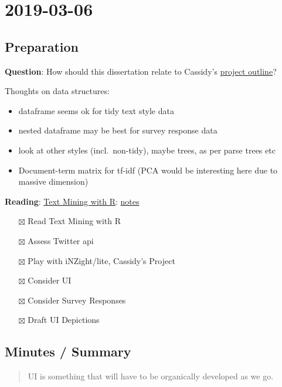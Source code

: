 \documentclass[11pt]{article}
\date{\today}
\title{}
\begin{document}
\tableofcontents

\section{2019-03-06}
\label{sec:orgde47e23}
\subsection{Preparation}
\label{sec:org7bba46c}
\textbf{Question}: How should this dissertation relate to Cassidy's
\href{../reading/CassidyStuff/CassidyStuff/Our\%20text\%20analytics\%20project.docx}{project
outline}?

Thoughts on data structures:

\begin{itemize}
\item dataframe seems ok for tidy text style data
\item nested dataframe may be best for survey response data
\item look at other styles (incl. non-tidy), maybe trees, as per parse trees
etc
\item Document-term matrix for tf-idf (PCA would be interesting here due to
massive dimension)
\end{itemize}

\textbf{Reading}: \href{https://www.tidytextmining.com}{Text Mining with R}:
\href{../notes/text\_mining\_with\_r.org}{notes}

\begin{itemize}
\item[{$\boxtimes$}] Read Text Mining with R
\item[{$\boxtimes$}] Assess Twitter api
\item[{$\boxtimes$}] Play with iNZight/lite, Cassidy's Project
\item[{$\boxtimes$}] Consider UI
\item[{$\boxtimes$}] Consider Survey Responses
\item[{$\boxtimes$}] Draft UI Depictions
\end{itemize}

\subsection{Minutes / Summary}
\label{sec:org2c30583}
\begin{quote}
UI is something that will have to be organically developed as we go.
\end{quote}
\end{document}
